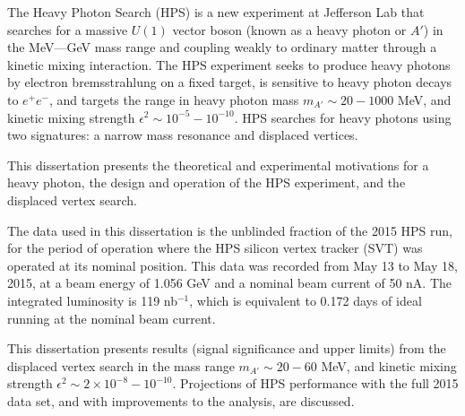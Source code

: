 
The Heavy Photon Search (HPS) is a new experiment at Jefferson Lab that searches for a massive $U(1)$ vector boson (known as a heavy photon or $A'$) in the MeV---GeV mass range and coupling weakly to ordinary matter through a kinetic mixing interaction.
The HPS experiment seeks to produce heavy photons by electron bremsstrahlung on a fixed target, is sensitive to heavy photon decays to $e^+e^-$, and targets the range in heavy photon mass $m_{A'} \sim 20-1000$ MeV, and kinetic mixing strength $\epsilon^2 \sim 10^{-5}-10^{-10}$.
HPS searches for heavy photons using two signatures: a narrow mass resonance and displaced vertices.

This dissertation presents the theoretical and experimental motivations for a heavy photon, the design and operation of the HPS experiment, and the displaced vertex search.

The data used in this dissertation is the unblinded fraction of the 2015 HPS run, for the period of operation where the HPS silicon vertex tracker (SVT) was operated at its nominal position.
This data was recorded from May 13 to May 18, 2015, at a beam energy of 1.056 GeV and a nominal beam current of 50 nA.
The integrated luminosity is 119 nb$^{-1}$, which is equivalent to 0.172 days of ideal running at the nominal beam current.

This dissertation presents results (signal significance and upper limits) from the displaced vertex search in the mass range $m_{A'} \sim 20-60$ MeV, and kinetic mixing strength $\epsilon^2 \sim 2\times 10^{-8}-10^{-10}$.
Projections of HPS performance with the full 2015 data set, and with improvements to the analysis, are discussed.



